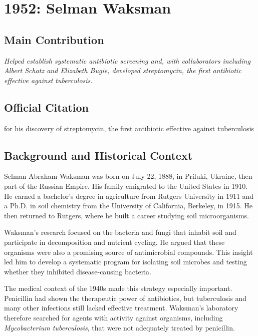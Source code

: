 \chapter[1952 --- Waksman]{1952: Selman Waksman}
\label{ch:1952_selmanwaksman}

\section*{Main Contribution}

\textit{Helped establish systematic antibiotic screening and, with collaborators including Albert Schatz and Elizabeth Bugie, developed streptomycin, the first antibiotic effective against tuberculosis.}\cite{nobel-1952,schatz-1992}

\section{Official Citation}

for his discovery of streptomycin, the first antibiotic effective against tuberculosis

\section{Background and Historical Context}

Selman Abraham Waksman was born on July 22, 1888, in Priluki, Ukraine, then part of the Russian Empire. His family emigrated to the United States in 1910. He earned a bachelor's degree in agriculture from Rutgers University in 1911 and a Ph.D. in soil chemistry from the University of California, Berkeley, in 1915. He then returned to Rutgers, where he built a career studying soil microorganisms.

Waksman's research focused on the bacteria and fungi that inhabit soil and participate in decomposition and nutrient cycling. He argued that these organisms were also a promising source of antimicrobial compounds. This insight led him to develop a systematic program for isolating soil microbes and testing whether they inhibited disease-causing bacteria.

The medical context of the 1940s made this strategy especially important. Penicillin had shown the therapeutic power of antibiotics, but tuberculosis and many other infections still lacked effective treatment. Waksman's laboratory therefore searched for agents with activity against organisms, including \textit{Mycobacterium tuberculosis}, that were not adequately treated by penicillin.

